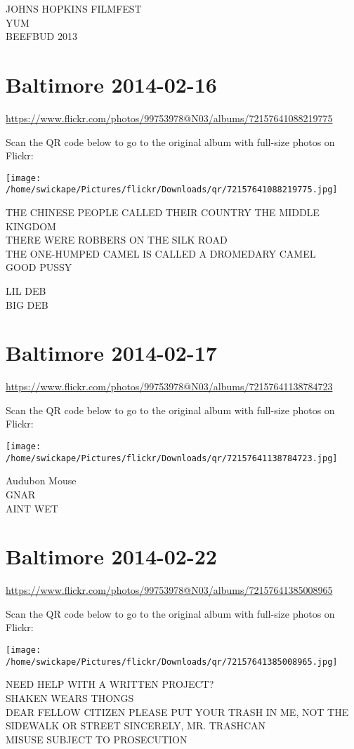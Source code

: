 \documentclass[10pt,letterpaper]{article}
\begin{document}
JOHNS HOPKINS FILMFEST\\
YUM\\
BEEFBUD 2013


\section*{Baltimore 2014-02-16}

\url{https://www.flickr.com/photos/99753978@N03/albums/72157641088219775}

Scan the QR code below to go to the original album with full-size photos on Flickr:

\texttt{[image: /home/swickape/Pictures/flickr/Downloads/qr/72157641088219775.jpg]}


THE CHINESE PEOPLE CALLED THEIR COUNTRY THE MIDDLE KINGDOM\\
THERE WERE ROBBERS ON THE SILK ROAD\\
THE ONE{-}HUMPED CAMEL IS CALLED A DROMEDARY CAMEL\\
GOOD PUSSY

LIL DEB\\
BIG DEB


\section*{Baltimore 2014-02-17}

\url{https://www.flickr.com/photos/99753978@N03/albums/72157641138784723}

Scan the QR code below to go to the original album with full-size photos on Flickr:

\texttt{[image: /home/swickape/Pictures/flickr/Downloads/qr/72157641138784723.jpg]}


Audubon Mouse\\
GNAR\\
AINT WET


\section*{Baltimore 2014-02-22}

\url{https://www.flickr.com/photos/99753978@N03/albums/72157641385008965}

Scan the QR code below to go to the original album with full-size photos on Flickr:

\texttt{[image: /home/swickape/Pictures/flickr/Downloads/qr/72157641385008965.jpg]}


NEED HELP WITH A WRITTEN PROJECT?\\
SHAKEN WEARS THONGS\\
DEAR FELLOW CITIZEN PLEASE PUT YOUR TRASH IN ME, NOT THE SIDEWALK OR STREET SINCERELY, MR. TRASHCAN\\
MISUSE SUBJECT TO PROSECUTION
\end{document}
